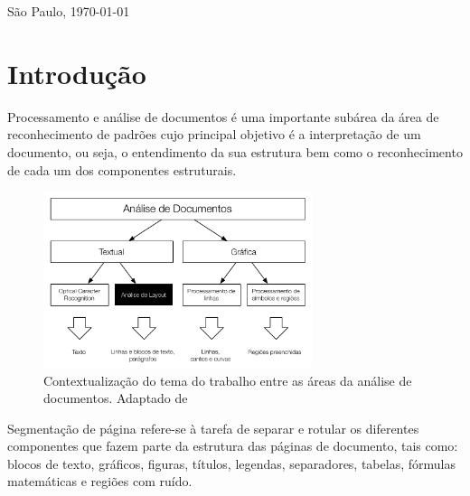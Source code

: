 \documentclass[a4paper,11pt]{article}
\begin{document}

\bigskip
\begin{center}
São Paulo, \today
\end{center}



\newpage
\setcounter{page}{1}



\section{Introdução}

\cite{Nina:2010a} \cite{trios:online} \cite{DBLP:conf/icdar/2009}

Processamento e análise de documentos é uma importante subárea da área
de reconhecimento de padrões cujo principal objetivo é a
interpretação de um documento, ou seja, o entendimento
da sua estrutura bem como o reconhecimento de cada um dos
componentes estruturais.

\begin{figure}[htb]
\begin{center}
\includegraphics[width=0.7\textwidth]{assets/document_processing_areas_hierarquies.pdf}
\end{center}
\caption{Contextualização do tema do trabalho entre as áreas da
  análise de documentos. Adaptado de~\cite{Kasturi_OGorman_Govindaraju_2002}}
\label{fig:context1}
\end{figure}

Segmentação de página refere-se à tarefa de separar e rotular os diferentes
componentes que fazem parte da estrutura das páginas de
documento, tais como: blocos de texto, gráficos, figuras, títulos,
legendas, separadores, tabelas, fórmulas matemáticas e regiões com
ruído.
\end{document}

